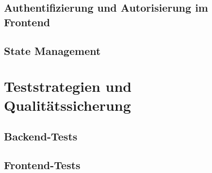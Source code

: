 \subsection{Authentifizierung und Autorisierung im Frontend}

\subsection{State Management}

\section{Teststrategien und Qualitätssicherung}\label{Teststrategien und Qualitätssicherung}

\subsection{Backend-Tests}

\subsection{Frontend-Tests}
